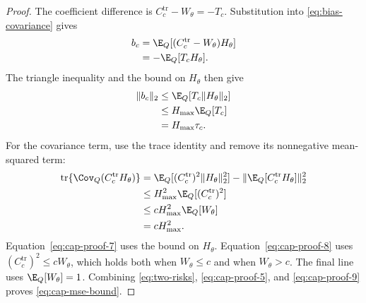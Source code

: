\begin{proof}
The coefficient difference is $C_c^{\mathrm{tr}}-W_\theta=-T_c$.  Substitution into
\eqref{eq:bias-covariance} gives
\begin{align}
  b_c
  &=\E_Q[(C_c^{\mathrm{tr}}-W_\theta)H_\theta]
    \label{eq:cap-proof-1}\\
  &=-\E_Q[T_cH_\theta].
    \label{eq:cap-proof-2}
\end{align}
The triangle inequality and the bound on $H_\theta$ then give
\begin{align}
  \|b_c\|_2
  &\le\E_Q[T_c\|H_\theta\|_2]
    \label{eq:cap-proof-3}\\
  &\le H_{\max}\E_Q[T_c]
    \label{eq:cap-proof-4}\\
  &=H_{\max}\tau_c.
    \label{eq:cap-proof-5}
\end{align}
For the covariance term, use the trace identity and remove its nonnegative
mean-squared term:
\begin{align}
  \operatorname{tr}\{\Cov_Q(C_c^{\mathrm{tr}}H_\theta)\}
  &=\E_Q[(C_c^{\mathrm{tr}})^2\|H_\theta\|_2^2]
    -\|\E_Q[C_c^{\mathrm{tr}}H_\theta]\|_2^2
    \label{eq:cap-proof-6}\\
  &\le H_{\max}^2\E_Q[(C_c^{\mathrm{tr}})^2]
    \label{eq:cap-proof-7}\\
  &\le cH_{\max}^2\E_Q[W_\theta]
    \label{eq:cap-proof-8}\\
  &=cH_{\max}^2.
    \label{eq:cap-proof-9}
\end{align}
Equation~\eqref{eq:cap-proof-7} uses the bound on $H_\theta$.
Equation~\eqref{eq:cap-proof-8} uses $(C_c^{\mathrm{tr}})^2\le cW_\theta$,
which holds both
when $W_\theta\le c$ and when $W_\theta>c$.  The final line uses
$\E_Q[W_\theta]=1$.  Combining \eqref{eq:two-risks},
\eqref{eq:cap-proof-5}, and \eqref{eq:cap-proof-9} proves
\eqref{eq:cap-mse-bound}.
\end{proof}
